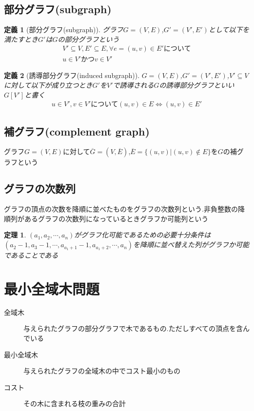 \documentclass[a4j,10.5pt]{jarticle}
\theoremstyle{break}
\newtheorem{defi}{定義}[section]
\newtheorem{theo}{定理}[section]
\begin{document}
\subsection{部分グラフ(subgraph)}
\begin{defi}[部分グラフ(subgraph)]
グラフ$G = (V,E)$,$G' = (V',E')$として以下を満たすとき$G'$は$G$の部分グラフという
\begin{eqnarray*}
V' \subseteq V,E' \subseteq E, 
\forall e = (u,v) \in E' について\\
u \in V' かつ v \in V'
\end{eqnarray*}
\end{defi}

\begin{defi}[誘導部分グラフ(induced subgraph)]
$G = (V,E)$,$G'=(V',E')$,$V'\subseteq V$に対して以下が成り立つとき$G'$を$V'$で誘導される$G$の誘導部分グラフといい$G[V']$と書く
\begin{eqnarray*}
u \in V',v \in V'について
(u,v) \in E \Leftrightarrow (u,v) \in E'
\end{eqnarray*}
\end{defi}

\subsection{補グラフ(complement graph)}
グラフ$G=(V,E)$に対して$\overline{G} = (V,\overline{E})$,$\overline{E} = \{(u,v)|(u,v) \notin E\}$を$G$の補グラフという

\subsection{グラフの次数列}
グラフの頂点の次数を降順に並べたものをグラフの次数列という.非負整数の降順列があるグラフの次数列になっているときグラフか可能列という

\begin{theo}
$(a_1,a_2,\cdots,a_n)$がグラフ化可能であるための必要十分条件は$(a_2 - 1,a_3 - 1,\cdots,a_{a_1 + 1} - 1,a_{a_1 + 2},\cdots,a_n)$を降順に並べ替えた列がグラフか可能であることである
\end{theo}

\newpage

\section{最小全域木問題}
\begin{description}
\item[全域木] 与えられたグラフの部分グラフで木であるもの.ただしすべての頂点を含んでいる
\item[最小全域木] 与えられたグラフの全域木の中でコスト最小のもの
\item[コスト] その木に含まれる枝の重みの合計
\end{description}
\end{document}
